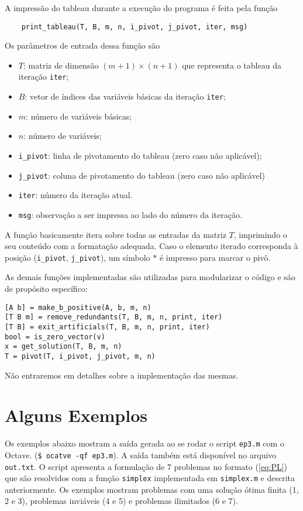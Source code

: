 \documentclass[12pt,a4paper]{article}
\newcommand{\zerar}{\setcounter{equation}{0}\setcounter{figure}{0}\setcounter{table}{0}}
\begin{document}
A impressão do tableau durante a execução do programa é feita pela função
%
\begin{verbatim}
	print_tableau(T, B, m, n, i_pivot, j_pivot, iter, msg)
\end{verbatim}
%
Os parâmetros de entrada dessa função são
%
\begin{itemize}
	\item $T$: matriz de dimensão $(m+1) \times (n+1)$ que representa o tableau da iteração 
	\verb|iter|;
	\item $B$: vetor de índices das variáveis básicas da iteração \verb|iter|;
	\item $m$: número de variáveis básicas;
	\item $n$: número de variáveis;
	\item \verb|i_pivot|: linha de pivotamento do tableau (zero caso não aplicável);
	\item \verb|j_pivot|: coluna de pivotamento do tableau (zero caso não aplicável)
	\item \verb|iter|: número da iteração atual.
	\item \verb|msg|: observação a ser impressa ao lado do número da iteração.
\end{itemize} 
%
A função basicamente itera sobre todas as entradas da matriz $T$, imprimindo o seu conteúdo com
a formatação adequada. Caso o elemento iterado corresponda à posição (\verb|i_pivot|, 
\verb|j_pivot|), um símbolo $\ast$ é impresso para marcar o pivô.


As demais funções implementadas são utilizadas para modularizar o código e são de propósito 
específico:
%
\begin{verbatim}
[A b] = make_b_positive(A, b, m, n)
[T B m] = remove_redundants(T, B, m, n, print, iter)
[T B] = exit_artificials(T, B, m, n, print, iter)
bool = is_zero_vector(v)
x = get_solution(T, B, m, n)
T = pivot(T, i_pivot, j_pivot, m, n)
\end{verbatim}
%
Não entraremos em detalhes sobre a implementação das mesmas.


\zerar
\section{Alguns Exemplos}
\label{sec:exemplos}

Os exemplos abaixo mostram a saída gerada ao se rodar o script \verb|ep3.m| com o Octave.
(\verb|$ ocatve -qf ep3.m|). A saída também está disponível no arquivo \verb|out.txt|.
O script apresenta a formulação de 7 problemas no formato  (\ref{eq:PL}) que são resolvidos com 
a função \verb|simplex| implementada em \verb|simplex.m| e descrita anteriormente. Os exemplos 
mostram problemas com uma solução ótima finita (1, 2 e 3), problemas inviáveis (4 e 5) e problemas 
ilimitados (6 e 7).
\end{document}
